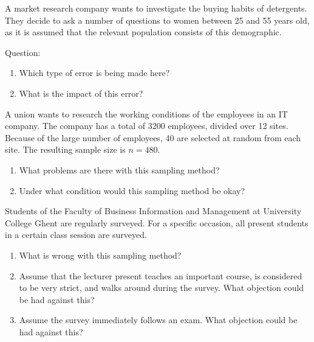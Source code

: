 \begin{exercise}
  A market research company wants to investigate the buying habits of detergents. They decide to ask a number of questions to women between 25 and 55 years old, as it is assumed that the relevant population consists of this demographic.
  
  Question:
  
  \begin{enumerate}[label=\alph*.]
    \item Which type of error is being made here?
    \item What is the impact of this error?
  \end{enumerate}
\end{exercise}

\begin{exercise}
  A union wants to research the working conditions of the employees in an IT company. The company has a total of 3200 employees, divided over 12 sites. Because of the large number of employees, 40 are selected at random from each site. The resulting sample size is $n = 480$.
  
  \begin{enumerate}[label=\alph*.]
    \item What problems are there with this sampling method?
    \item Under what condition would this sampling method be okay?
  \end{enumerate}
\end{exercise}

\begin{exercise}
  Students of the Faculty of Business Information and Management at University College Ghent are regularly surveyed. For a specific occasion, all present students in a certain class session are surveyed.
  
  \begin{enumerate}[label=\alph*.]
    \item What is wrong with this sampling method?
    \item Assume that the lecturer present teaches an important course, is considered to be very strict, and walks around during the survey. What objection could be had against this?
    \item Assume the survey immediately follows an exam. What objection could be had against this?
  \end{enumerate}
\end{exercise}


